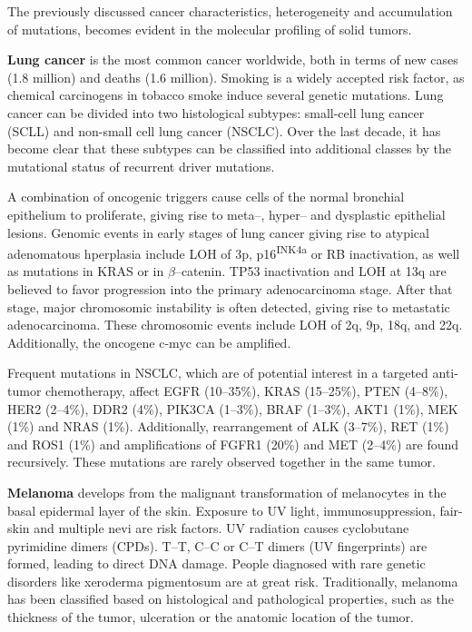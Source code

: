     The previously discussed cancer characteristics, heterogeneity and
    accumulation of mutations, becomes evident in the molecular profiling
    of solid tumors.

    \textbf{Lung cancer} is the most common cancer worldwide, both in terms of
    new cases (1.8 million) and deaths (1.6 million). Smoking is a widely
    accepted risk factor, as chemical carcinogens in tobacco smoke induce
    several genetic mutations. Lung cancer can be divided
    into two histological subtypes: small-cell lung cancer (SCLL) and non-small
    cell lung cancer (NSCLC). Over the last decade, it has become clear that
    these subtypes can be classified into  additional classes by the mutational
    status of recurrent driver mutations.

    A combination of oncogenic triggers cause cells of the normal bronchial
    epithelium to proliferate, giving rise to meta--, hyper-- and dysplastic
    epithelial lesions. Genomic events in early stages of lung cancer giving
    rise to atypical adenomatous hperplasia include LOH of 3p,
    p16\textsuperscript{INK4a} or RB inactivation, as well as
    mutations in KRAS or in $\beta$--catenin. TP53
    inactivation and LOH at 13q are believed to favor progression into
    the primary adenocarcinoma stage. After that stage, major chromosomic
    instability is often detected, giving rise to metastatic adenocarcinoma.
    These chromosomic events include LOH of 2q, 9p, 18q,
    and 22q. Additionally, the oncogene c-myc can be amplified.

    Frequent  mutations in NSCLC, which are of potential interest in a targeted
    anti-tumor chemotherapy, affect EGFR (10--35\%), KRAS (15--25\%), PTEN
    (4--8\%), HER2 (2--4\%), DDR2 (4\%), PIK3CA (1--3\%), BRAF (1--3\%), AKT1
    (1\%), MEK (1\%) and NRAS (1\%). Additionally, rearrangement of ALK
    (3--7\%), RET (1\%) and ROS1 (1\%) and amplifications of FGFR1 (20\%) and
    MET (2--4\%) are found recursively. These mutations are rarely observed
    together in the same tumor.

    \textbf{Melanoma} develops from the malignant transformation of melanocytes
    in the basal epidermal layer of the skin. Exposure to UV light,
    immunosuppression, fair-skin and multiple nevi are risk factors. UV
    radiation causes cyclobutane pyrimidine dimers (CPDs). T--T, C--C or C--T
    dimers (UV fingerprints) are formed, leading to direct DNA damage. People
    diagnosed with rare genetic disorders like xeroderma pigmentosum are at
    great risk. Traditionally, melanoma has been classified based on
    histological and pathological properties, such as the thickness of the
    tumor, ulceration or the anatomic location of the tumor.

